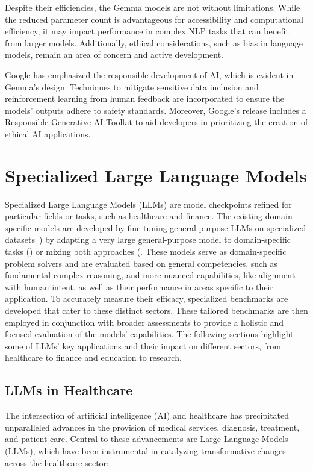 Despite their efficiencies, the Gemma models are not without limitations.
While the reduced parameter count is advantageous for accessibility and computational efficiency, it may impact performance in complex NLP tasks that can benefit from larger models.
Additionally, ethical considerations, such as bias in language models, remain an area of concern and active development.

Google has emphasized the responsible development of AI, which is evident in Gemma's design.
Techniques to mitigate sensitive data inclusion and reinforcement learning from human feedback are incorporated to ensure the models' outputs adhere to safety standards.
Moreover, Google's release includes a Responsible Generative AI Toolkit to aid developers in prioritizing the creation of ethical AI applications.


\section{Specialized Large Language Models}
\label{sec:applications-of-large-language-models}

Specialized Large Language Models (LLMs) are model checkpoints refined for particular fields or tasks, such as healthcare and finance.
The existing domain-specific models are developed by fine-tuning general-purpose LLMs on specialized datasets~\cite{luo2022biogpt,bolton2023biomedlm, taylor2022galactica}) by adapting a very large general-purpose model to domain-specific tasks (\textcite{singhal2022large, liang2022holistic}) or mixing both approaches (\textcite{wu2023bloomberggpt}.
These models serve as domain-specific problem solvers and are evaluated based on general competencies, such as fundamental complex reasoning, and more nuanced capabilities, like alignment with human intent, as well as their performance in areas specific to their application.
To accurately measure their efficacy, specialized benchmarks are developed that cater to these distinct sectors.
These tailored benchmarks are then employed in conjunction with broader assessments to provide a holistic and focused evaluation of the models' capabilities.
The following sections highlight some of LLMs' key applications and their impact on different sectors, from healthcare to finance and education to research.

\subsection{LLMs in Healthcare}
\label{subsec:llms-in-healthcare}
The intersection of artificial intelligence (AI) and healthcare has precipitated unparalleled advances in the provision of medical services, diagnosis, treatment, and patient care.
Central to these advancements are Large Language Models (LLMs), which have been instrumental in catalyzing transformative changes across the healthcare sector:

